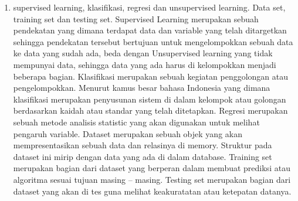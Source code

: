 \begin {enumerate}
\item
supervised learning, klasifikasi, regresi dan unsupervised learning. Data set, training set dan testing set.
\subitem
Supervised Learning merupakan sebuah pendekatan yang dimana terdapat data dan variable yang telah ditargetkan sehingga pendekatan tersebut bertujuan untuk mengelompokkan sebuah data ke data yang sudah ada, beda dengan Unsupervised learning yang tidak mempunyai data, sehingga data yang ada harus di kelompokkan menjadi beberapa bagian.
\subitem
Klasifikasi merupakan sebuah kegiatan penggolongan atau pengelompokkan. Menurut kamus besar bahasa Indonesia yang dimana klasifikasi merupakan penyusunan sistem di dalam kelompok atau golongan berdasarkan kaidah atau standar yang telah ditetapkan. Regresi merupakan sebuah metode analisis statistic yang akan digunakan untuk melihat pengaruh variable.
\subitem
Dataset merupakan sebuah objek yang akan mempresentasikan sebuah data dan relasinya di memory. Struktur pada dataset ini mirip dengan data yang ada di dalam database. Training set merupakan bagian dari dataset yang berperan dalam membuat prediksi atau algoritma sesuai tujuan masing – masing. Testing set merupakan bagian dari dataset yang akan di tes guna melihat keakuratatan atau ketepatan datanya.
\end {enumerate}

